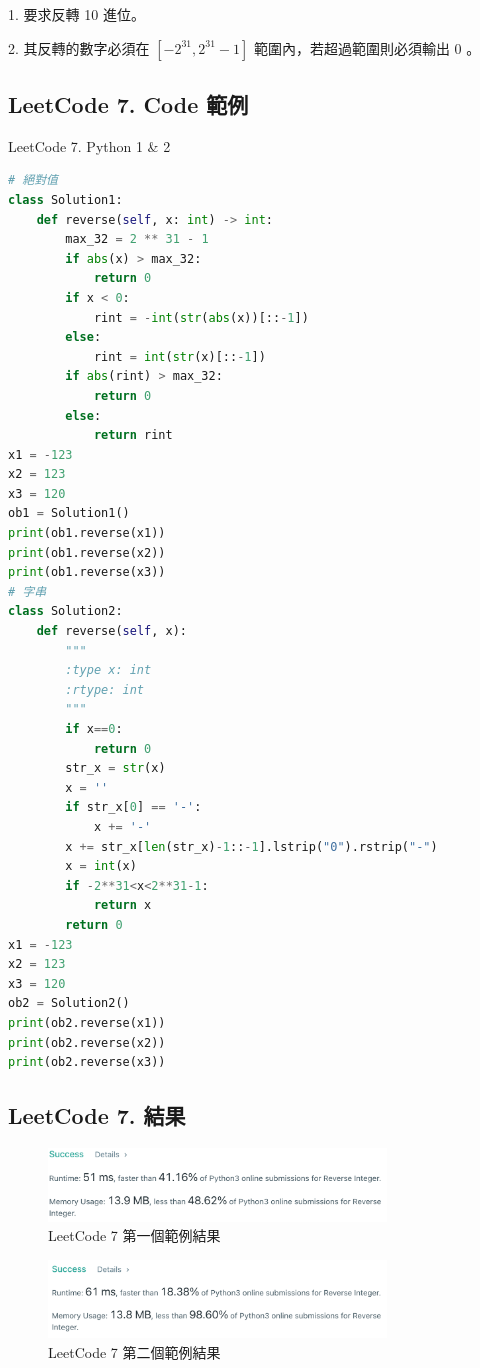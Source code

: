 \documentclass[10pt,UTF8]{ctexart}
\begin{document}
1. 要求反轉 10 進位。

2. 其反轉的數字必須在 $[−2^31, 2^31 − 1]$ 範圍內，若超過範圍則必須輸出 0 。

\subsection{LeetCode 7. Code 範例}

LeetCode 7. Python 1 \& 2

\begin{lstlisting}[language={python}]
# 絕對值
class Solution1:
    def reverse(self, x: int) -> int:
        max_32 = 2 ** 31 - 1
        if abs(x) > max_32:
            return 0
        if x < 0:
            rint = -int(str(abs(x))[::-1])
        else:
            rint = int(str(x)[::-1])
        if abs(rint) > max_32:
            return 0
        else:
            return rint 
x1 = -123
x2 = 123
x3 = 120
ob1 = Solution1()
print(ob1.reverse(x1))
print(ob1.reverse(x2))
print(ob1.reverse(x3))
# 字串
class Solution2:
    def reverse(self, x):
        """
        :type x: int
        :rtype: int
        """
        if x==0:
            return 0
        str_x = str(x)
        x = ''
        if str_x[0] == '-':
            x += '-'
        x += str_x[len(str_x)-1::-1].lstrip("0").rstrip("-")
        x = int(x)
        if -2**31<x<2**31-1:
            return x
        return 0
x1 = -123
x2 = 123
x3 = 120
ob2 = Solution2()
print(ob2.reverse(x1))
print(ob2.reverse(x2))
print(ob2.reverse(x3))
\end{lstlisting}

\subsection{LeetCode 7. 結果}

\begin{figure}[H]
\centering 
\includegraphics[width=0.80\textwidth]{lc-7-1.png} 
\caption{LeetCode 7 第一個範例結果}
\label{Test}
\end{figure}

\begin{figure}[H]
\centering 
\includegraphics[width=0.80\textwidth]{lc-7-2.png} 
\caption{LeetCode 7 第二個範例結果}
\label{Test}
\end{figure}
\end{document}
